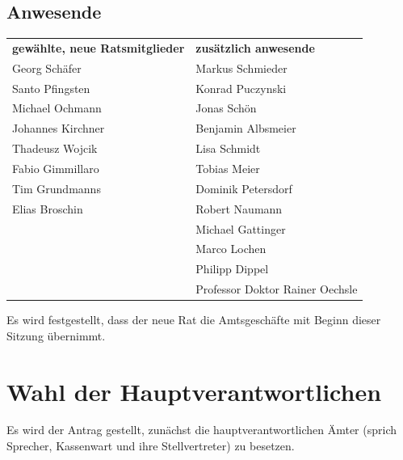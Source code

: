\documentclass[a4paper, 11pt]{article} %
\begin{document}
\subsection{Anwesende}
\begin{tabular}{ll}
	\textbf{gewählte, neue Ratsmitglieder} & \textbf{zusätzlich anwesende}\\
	Georg Schäfer & Markus Schmieder\\
	Santo Pfingsten & Konrad Puczynski\\
	Michael Ochmann & Jonas Schön\\
	Johannes Kirchner & Benjamin Albsmeier\\
	Thadeusz Wojcik & Lisa Schmidt\\
	Fabio Gimmillaro & Tobias Meier\\
	Tim Grundmanns & Dominik Petersdorf\\
	Elias Broschin & Robert Naumann\\
	 & Michael Gattinger\\
	 & Marco Lochen\\
	 & Philipp Dippel\\
	 & Professor Doktor Rainer Oechsle
\end{tabular}
\vspace{1.0cm}
\begin{flushleft}
Es wird festgestellt, dass der neue Rat die Amtsgeschäfte mit Beginn dieser Sitzung übernimmt.
\end{flushleft}

\section{Wahl der Hauptverantwortlichen}
Es wird der Antrag gestellt, zunächst die hauptverantwortlichen Ämter (sprich Sprecher, Kassenwart und ihre Stellvertreter) zu besetzen.
\end{document}
